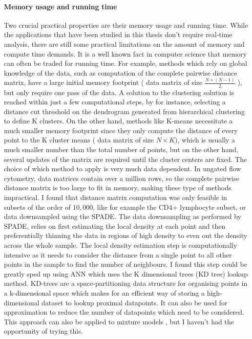 \paragraph{Memory usage and running time}
Two crucial practical properties are their memory usage and running time.
While the applications that have been studied in this thesis don’t require real-time analysis, there are still some practical limitations on the amount of memory and compute time demands.
It is a well known fact in computer science that memory can often be traded for running time.
For example, methods which rely on global knowledge of the data, such as computation of the complete pairwise distance matrix,
have a large initial memory footprint ( data matrix of size $\frac{N \times (N-1)}{2}$ ), but only require one pass of the data.
A solution to the clustering solution is reached within just a few computational steps, by for instance,
selecting a distance cut threshold on the dendrogram generated from hierarchical clustering to define K clusters. 
On the other hand, methods like K-means necessitate a much smaller memory footprint
since they only compute the distance of every point to the K cluster means
( data matrix of size $N \times K$), which is usually a much smaller number than the total number of points,
but on the other hand, several updates of the matrix are required until the cluster centers are fixed.
The choice of which method to apply is very much data dependent.
In ungated flow cytometry, data matrices  contain over a million rows, so the complete pairwise distance matrix is too large to fit in memory,
making these type of methods impractical.
I found that distance matrix computation was only feasible in subsets of the order of $10,000$,
like for example the CD4+ lymphocyte subset, or data downsampled using the SPADE.
The data downsampling as performed by SPADE, relies on 
first estimating the local density at each point
and then preferentially thinning the data in regions of high density to even out the density 
across the whole sample.
The local density estimation step is computationally intensive as it needs to consider the distance from
a single point to all other points in the sample to find the number of neighbours.
I found this step could be greatly sped up using \gls{ANN} which uses the K dimensional trees (KD tree) lookup method.
KD-trees are a space-partitioning data structure for organising points in a k-dimensional space which makes for an efficient
way of storing a high-dimensional dataset to lookup proximal datapoints.
It can also be used for approximation to reduce the number of datapoints which need to be considered.
This approach can also be applied to mixture models \citep{McLachlan:2004uw}, but I haven’t had the opportunity of trying this. 


